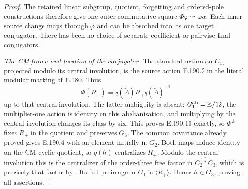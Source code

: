 \begin{proof}
The retained linear subgroup, quotient, forgetting
and ordered-pole constructions therefore give one
outer-commutative square
\(\Phi\varphi\simeq\varphi\alpha\).
Each inner source change maps through \(\varphi\)
and can be absorbed into its one target conjugator.
There has been no choice of separate coefficient
or pairwise final conjugators.

\emph{The CM frame and location of the conjugator.}
The standard action on \(G_1\), projected modulo
its central involution, is the source action
E.190.2 in the literal modular marking of
E.180.  Thus
\[
       \Phi(R_+)=q(\widetilde A)R_+
                       q(\widetilde A)^{-1}
\tag{E.190.10}
\]
up to that central involution.  The latter
ambiguity is absent: \(G_1^{\rm ab}=\mathbb Z/12\),
the multiplier-one action is identity on this
abelianization, and multiplying by the central
involution changes its class by six.
This proves E.190.10 exactly, so \(\Phi^A\)
fixes \(R_+\) in the quotient and preserves \(G_3\).
The common covariance already proved gives
E.190.4 with an element initially in \(G_2\).
Both maps induce identity on the CM cyclic
quotient, so \(q(h)\) centralizes \(R_+\).
Modulo the central involution this is the
centralizer of the order-three free factor
in \(\widehat{C_2*C_3}\), which is precisely
that factor by
\citet[Theorems A--B and B', pp.155--160]
{SymHerfortRibes1985}.
Its full preimage in \(G_1\) is
\(\langle R_+\rangle\).
Hence \(h\in G_3\), proving all assertions.
\end{proof}
